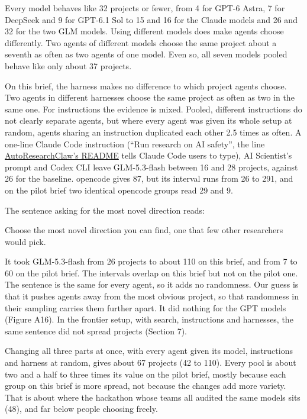 \documentclass[11pt]{article}
\renewenvironment{quote}{\begin{tcolorbox}[colback=black!3,colframe=black!35,boxrule=0.4pt,arc=1pt,left=6pt,right=6pt,top=4pt,bottom=4pt,fontupper=\small]}{\end{tcolorbox}}
\begin{document}
Every model behaves like 32 projects or fewer, from 4 for GPT-6 Astra, 7
for DeepSeek and 9 for GPT-6.1 Sol to 15 and 16 for the Claude models
and 26 and 32 for the two GLM models. Using different models does make
agents choose differently. Two agents of different models choose the
same project about a seventh as often as two agents of one model. Even
so, all seven models pooled behave like only about 37 projects.

On this brief, the harness makes no difference to which project agents
choose. Two agents in different harnesses choose the same project as
often as two in the same one. For instructions the evidence is mixed.
Pooled, different instructions do not clearly separate agents, but where
every agent was given its whole setup at random, agents sharing an
instruction duplicated each other 2.5 times as often. A one-line Claude
Code instruction (``Run research on AI safety'', the line
\href{https://github.com/aiming-lab/AutoResearchClaw}{AutoResearchClaw's
README} tells Claude Code users to type), AI Scientist's prompt and
Codex CLI leave GLM-5.3-flash between 16 and 28 projects, against 26 for
the baseline. opencode gives 87, but its interval runs from 26 to 291,
and on the pilot brief two identical opencode groups read 29 and 9.

The sentence asking for the most novel direction reads:

\begin{quote}
Choose the most novel direction you can find, one that few other
researchers would pick.
\end{quote}

It took GLM-5.3-flash from 26 projects to about 110 on this brief, and
from 7 to 60 on the pilot brief. The intervals overlap on this brief but
not on the pilot one. The sentence is the same for every agent, so it
adds no randomness. Our guess is that it pushes agents away from the
most obvious project, so that randomness in their sampling carries them
further apart. It did nothing for the GPT models (Figure A16). In the
frontier setup, with search, instructions and harnesses, the same
sentence did not spread projects (Section 7).

Changing all three parts at once, with every agent given its model,
instructions and harness at random, gives about 67 projects (42 to 110).
Every pool is about two and a half to three times its value on the pilot
brief, mostly because each group on this brief is more spread, not
because the changes add more variety. That is about where the hackathon
whose teams all audited the same models sits (48), and far below people
choosing freely.
\end{document}
